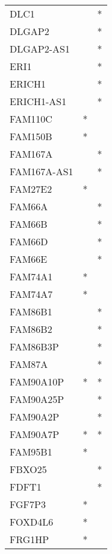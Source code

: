 \begin{longtable}{lcc}
DLC1         &                &          * \\
DLGAP2       &                &          * \\
DLGAP2-AS1   &                &          * \\
ERI1         &                &          * \\
ERICH1       &                &          * \\
ERICH1-AS1   &                &          * \\
FAM110C      &              * &            \\
FAM150B      &              * &            \\
FAM167A      &                &          * \\
FAM167A-AS1  &                &          * \\
FAM27E2      &              * &            \\
FAM66A       &                &          * \\
FAM66B       &                &          * \\
FAM66D       &                &          * \\
FAM66E       &                &          * \\
FAM74A1      &              * &            \\
FAM74A7      &              * &            \\
FAM86B1      &                &          * \\
FAM86B2      &                &          * \\
FAM86B3P     &                &          * \\
FAM87A       &                &          * \\
FAM90A10P    &              * &          * \\
FAM90A25P    &                &          * \\
FAM90A2P     &                &          * \\
FAM90A7P     &              * &          * \\
FAM95B1      &              * &            \\
FBXO25       &                &          * \\
FDFT1        &                &          * \\
FGF7P3       &              * &            \\
FOXD4L6      &              * &            \\
FRG1HP       &              * &            \\

\end{longtable}

